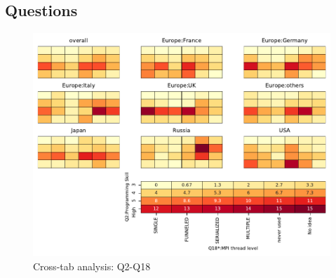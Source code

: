 
\subsection{Questions}


\begin{figure}
\begin{center}
\includegraphics[width=12cm]{../pdfs/Q2-Q18.pdf}
\caption{Cross-tab analysis: Q2-Q18}
\label{fig:Q2-Q18}
\end{center}
\end{figure}
